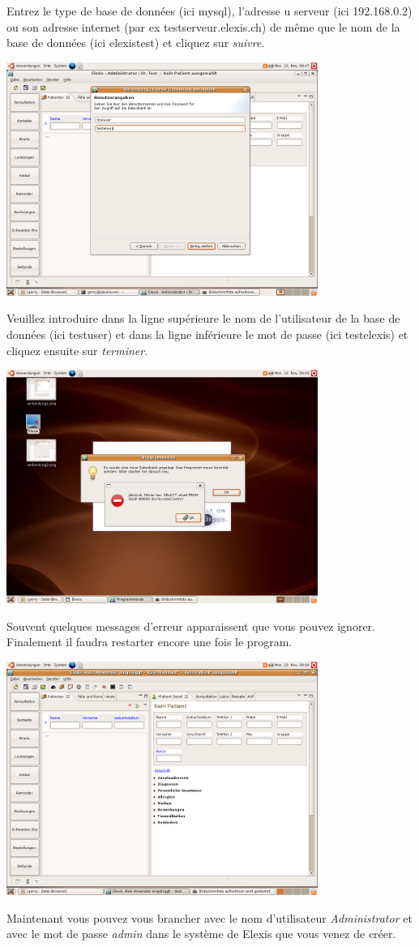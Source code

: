 Entrez le type de base de données (ici mysql), l'adresse u serveur (ici 192.168.0.2) ou son adresse internet (par ex testserveur.elexis.ch) de même que le nom de la base de données (ici elexistest) et cliquez sur \textit{suivre}.

\includegraphics[width=4in]{images/verbindung2.png}

Veuillez introduire dans la ligne supérieure le nom de l'utilisateur de la base de données (ici testuser) et dans la ligne inférieure le mot de passe (ici testelexis) et cliquez ensuite sur \textit{terminer}.

\includegraphics[width=4in]{images/verbindung3.png}

Souvent quelques messages d'erreur apparaissent que vous pouvez ignorer. Finalement il faudra restarter encore une fois le  program.

\includegraphics[width=4in]{images/verbindung4.png}


 Maintenant vous pouvez vous brancher avec le nom d'utilisateur \textit{Administrator} et avec le mot de passe \textit{admin} dans le système de Elexis que vous venez de créer. 
